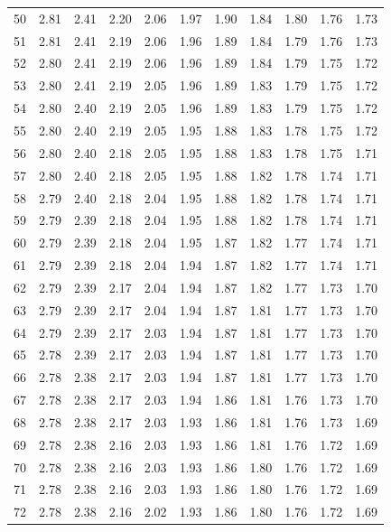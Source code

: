 \documentclass[
]{book}
\theoremstyle{definition}
\theoremstyle{definition}
\theoremstyle{definition}
\theoremstyle{definition}
\theoremstyle{remark}
\begin{document}
\begin{longtable}[]{@{}ccccccccccc@{}}
50 & 2.81 & 2.41 & 2.20 & 2.06 & 1.97 & 1.90 & 1.84 & 1.80 & 1.76 & 1.73 \\
51 & 2.81 & 2.41 & 2.19 & 2.06 & 1.96 & 1.89 & 1.84 & 1.79 & 1.76 & 1.73 \\
52 & 2.80 & 2.41 & 2.19 & 2.06 & 1.96 & 1.89 & 1.84 & 1.79 & 1.75 & 1.72 \\
53 & 2.80 & 2.41 & 2.19 & 2.05 & 1.96 & 1.89 & 1.83 & 1.79 & 1.75 & 1.72 \\
54 & 2.80 & 2.40 & 2.19 & 2.05 & 1.96 & 1.89 & 1.83 & 1.79 & 1.75 & 1.72 \\
55 & 2.80 & 2.40 & 2.19 & 2.05 & 1.95 & 1.88 & 1.83 & 1.78 & 1.75 & 1.72 \\
56 & 2.80 & 2.40 & 2.18 & 2.05 & 1.95 & 1.88 & 1.83 & 1.78 & 1.75 & 1.71 \\
57 & 2.80 & 2.40 & 2.18 & 2.05 & 1.95 & 1.88 & 1.82 & 1.78 & 1.74 & 1.71 \\
58 & 2.79 & 2.40 & 2.18 & 2.04 & 1.95 & 1.88 & 1.82 & 1.78 & 1.74 & 1.71 \\
59 & 2.79 & 2.39 & 2.18 & 2.04 & 1.95 & 1.88 & 1.82 & 1.78 & 1.74 & 1.71 \\
60 & 2.79 & 2.39 & 2.18 & 2.04 & 1.95 & 1.87 & 1.82 & 1.77 & 1.74 & 1.71 \\
61 & 2.79 & 2.39 & 2.18 & 2.04 & 1.94 & 1.87 & 1.82 & 1.77 & 1.74 & 1.71 \\
62 & 2.79 & 2.39 & 2.17 & 2.04 & 1.94 & 1.87 & 1.82 & 1.77 & 1.73 & 1.70 \\
63 & 2.79 & 2.39 & 2.17 & 2.04 & 1.94 & 1.87 & 1.81 & 1.77 & 1.73 & 1.70 \\
64 & 2.79 & 2.39 & 2.17 & 2.03 & 1.94 & 1.87 & 1.81 & 1.77 & 1.73 & 1.70 \\
65 & 2.78 & 2.39 & 2.17 & 2.03 & 1.94 & 1.87 & 1.81 & 1.77 & 1.73 & 1.70 \\
66 & 2.78 & 2.38 & 2.17 & 2.03 & 1.94 & 1.87 & 1.81 & 1.77 & 1.73 & 1.70 \\
67 & 2.78 & 2.38 & 2.17 & 2.03 & 1.94 & 1.86 & 1.81 & 1.76 & 1.73 & 1.70 \\
68 & 2.78 & 2.38 & 2.17 & 2.03 & 1.93 & 1.86 & 1.81 & 1.76 & 1.73 & 1.69 \\
69 & 2.78 & 2.38 & 2.16 & 2.03 & 1.93 & 1.86 & 1.81 & 1.76 & 1.72 & 1.69 \\
70 & 2.78 & 2.38 & 2.16 & 2.03 & 1.93 & 1.86 & 1.80 & 1.76 & 1.72 & 1.69 \\
71 & 2.78 & 2.38 & 2.16 & 2.03 & 1.93 & 1.86 & 1.80 & 1.76 & 1.72 & 1.69 \\
72 & 2.78 & 2.38 & 2.16 & 2.02 & 1.93 & 1.86 & 1.80 & 1.76 & 1.72 & 1.69 \\

\end{longtable}
\end{document}
